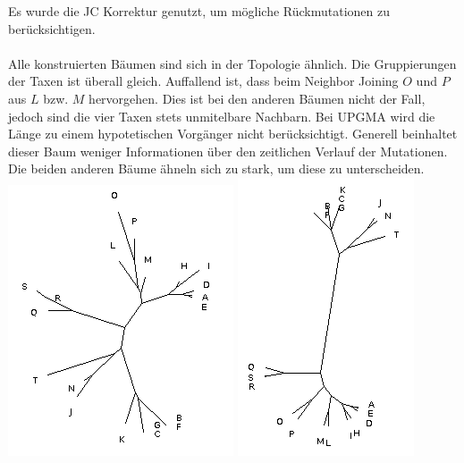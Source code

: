 \documentclass{homework}
\begin{document}
\begin{enumerate}
Es wurde die JC Korrektur genutzt, um mögliche Rückmutationen zu berücksichtigen. \\ \\
Alle konstruierten Bäumen sind sich in der Topologie ähnlich. Die Gruppierungen der Taxen ist überall gleich. Auffallend ist, dass beim Neighbor Joining $O$ und $P$ aus $L$ bzw. $M$ hervorgehen. Dies ist bei den anderen Bäumen nicht der Fall, jedoch sind die vier Taxen stets unmitelbare Nachbarn. Bei UPGMA wird die Länge zu einem hypotetischen Vorgänger nicht berücksichtigt. Generell beinhaltet dieser Baum weniger Informationen über den zeitlichen Verlauf der Mutationen. Die beiden anderen Bäume ähneln sich zu stark, um diese zu unterscheiden.
	\includegraphics[scale=0.4]{u3_aufg2_neighbor_joining.png} 
	\includegraphics[scale=0.4]{u3_aufg2_upgma.png} 

\end{enumerate}
\end{document}
